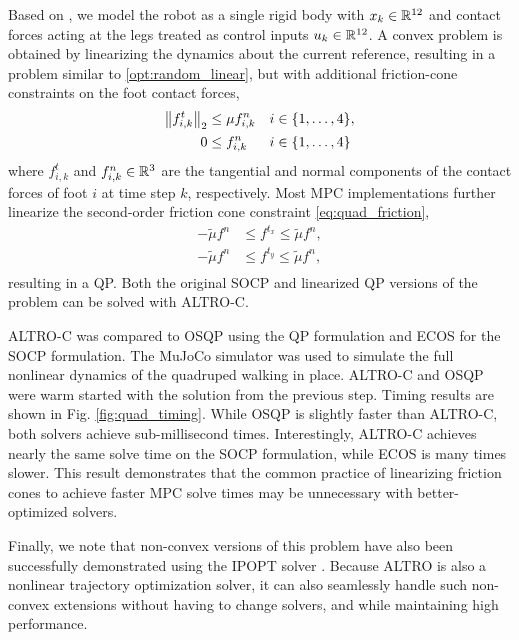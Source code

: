 \documentclass[../root.tex]{subfiles}
\begin{document}
Based on \cite{carlo_Dynamic_2018}, we model the robot as a single rigid body 
with $x_k \in \mathbb{R}^{12}$ and contact forces acting at the legs treated as
control inputs $u_k \in \mathbb{R}^{12}$.
A convex problem is obtained by linearizing the dynamics about the current
reference, resulting in a problem similar to \eqref{opt:random_linear}, but
with additional friction-cone constraints on the foot contact forces,
\begin{subequations}
\begin{align}
    \norm{f_{i,k}^t}_2 &\leq \mu f_{i,k}^n  && i \in \{1,\hdots,4\} ,\label{eq:quad_friction} \\
    0 &\leq f_{i,k}^n && i \in \{1, \hdots, 4\}
\end{align}
\end{subequations}
where $f_{i,k}^t$ and $f_{i,k}^n \in \mathbb{R}^{3}$ are the tangential and normal
components of the contact forces of foot $i$ at time step $k$, respectively.
Most MPC implementations further linearize the second-order friction cone
constraint \eqref{eq:quad_friction},
\begin{equation}
\begin{aligned}
    -\tilde{\mu} f^{n} &\leq f^{t_x} \leq \tilde{\mu} f^{n} ,\\ 
    -\tilde{\mu} f^{n} &\leq f^{t_y} \leq \tilde{\mu} f^{n} ,\\ 
\end{aligned}
\end{equation}
resulting in a QP. Both the original SOCP and linearized QP versions of the
problem can be solved with ALTRO-C.

ALTRO-C was compared to OSQP using the QP formulation and ECOS for the SOCP
formulation. The MuJoCo simulator \cite{todorov_MuJoCo_2012} was used to
simulate the full nonlinear dynamics of the quadruped walking in place.
ALTRO-C and OSQP were warm started with the solution from the previous step.
Timing results are shown in Fig. \ref{fig:quad_timing}. While OSQP is
slightly faster than ALTRO-C, both solvers achieve sub-millisecond times.
Interestingly, ALTRO-C achieves nearly the same solve time on the SOCP
formulation, while ECOS is many times slower. This result demonstrates that
the common practice of linearizing friction cones to achieve faster MPC solve
times may be unnecessary with better-optimized solvers.

Finally, we note that non-convex versions of this problem have also been
successfully demonstrated using the IPOPT solver \cite{bledt_Implementing_2019}.
Because ALTRO is also a nonlinear trajectory optimization solver, it can also
seamlessly handle such non-convex extensions without having to change solvers,
and while maintaining high performance.
\end{document}
